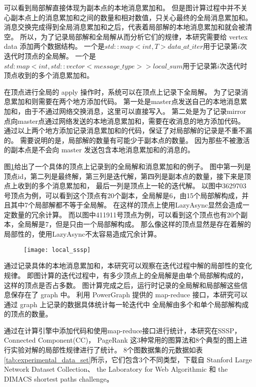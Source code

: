 可以看到局部解直接体现为副本点的本地消息累加和。
但是图计算过程中并不关心副本点上的消息累加和之间的数量和相对数值，只关心最终的全局消息累加和。
消息交换完成得到全局消息累加和之后，代表着局部解的本地消息累加和就会被清空。
所以，为了记录局部解和全局解从而分析它们的规律，本研究需要给 vertex data 添加两个数据结构。
一个是$std::map<int,T> data\_at\_iter$用于记录第$i$次迭代时顶点的全局解。
一个是$std:map<int, std::vector<message\_type>> local\_sum$用于记录第$i$次迭代时
顶点收到的多个消息累加和。

在顶点进行全局的 apply 操作时，系统可以在顶点上记录下全局解。
为了记录消息累加和则需要在两个地方添加代码。
第一处是master点发送自己的本地消息累加和，由于不通过网络交换消息，这里可以直接写入。
第二处是为了记录mirror点向master点通过网络发送的本地消息累加和，需要在收消息的地方添加代码。
通过以上两个地方添加记录消息累加和的代码，保证了对局部解的记录是不重不漏的。 
需要说明的是，局部解的数量有可能少于副本点的数量。
因为那些不被激活的副本点是不会向 master 发送包含本地消息累加和的消息的。


图\ref{fig:local_sssp}给出了一个具体的顶点上记录到的全局解和消息累加和的例子。
图中第一列是顶点id，第二列是最终解，第三列是迭代解，第四列是副本点的数量，接下来是顶点上收到的多个消息累加和，
最后一列是顶点上一轮的迭代解。
以图中3629703号顶点为例，可以看到这个顶点有20个副本，全局解是6，由15个局部解构成，并且其中7个局部解都不等于全局解。
在这样的顶点上使用LazyAsync显然会造成一定数量的冗余计算。
而以图中411911号顶点为例，可以看到这个顶点也有20个副本，全局解是7，但是只由一个局部解构成。
那么像这样的顶点显然是存在着解的局部性的，使用LazyAsync不太容易造成冗余计算。


\begin{figure}[H]
  \centering
  \texttt{[image: local\_sssp]}
  \label{fig:local_sssp}
\end{figure}
通过记录具体的本地消息累加和，本研究可以观察在迭代过程中解的局部性的变化规律。
即图计算的迭代过程中，有多少顶点上的全局解是由单个局部解构成的，这样的顶点是否占多数。
图计算完成之后，运行时记录的全局解和局部解这些信息保存在了 graph 中。 
利用 PowerGraph 提供的 map-reduce 接口，本研究可以通过 graph 上记录的数据具体统计每一轮迭代中
全局解由多个和单个局部解构成的顶点的数量。



通过在计算引擎中添加代码和使用map-reduce接口进行统计，本研究在SSSP， 
Connected Component(CC)，
PageRank 这3种常用的图算法和8个典型的图上进行实验对解的局部性规律进行了统计。
8个图数据集的元数据如表\ref{tab:experimental_data_set}所示，它们包含3个不同类型，下载自
Stanford Large Network Dataset Collection\cite{SNAP}、
the Laboratory for Web Algorithmic \cite{LAW}
和 the DIMACS shortest paths challenge\cite{DIMACS}。


